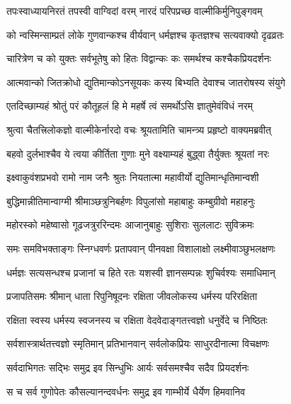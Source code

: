 
\twolineshloka
{तपःस्वाध्यायनिरतं तपस्वी वाग्विदां वरम्}
{नारदं परिपप्रच्छ वाल्मीकिर्मुनिपुङ्गवम्} %

\twolineshloka
{को न्वस्मिन्साम्प्रतं लोके गुणवान्कश्च वीर्यवान्}
{धर्मज्ञश्च कृतज्ञश्च सत्यवाक्यो दृढव्रतः} %

\twolineshloka
{चारित्रेण च को युक्तः सर्वभूतेषु को हितः}
{विद्वान्कः कः समर्थश्च कश्चैकप्रियदर्शनः} %

\twolineshloka
{आत्मवान्को जितक्रोधो द्युतिमान्कोऽनसूयकः}
{कस्य बिभ्यति देवाश्च जातरोषस्य संयुगे} %

\twolineshloka
{एतदिच्छाम्यहं श्रोतुं परं कौतूहलं हि मे}
{महर्षे त्वं समर्थोऽसि ज्ञातुमेवंविधं नरम्} %

\twolineshloka
{श्रुत्वा चैतत्त्रिलोकज्ञो वाल्मीकेर्नारदो वचः}
{श्रूयतामिति चामन्त्र्य प्रहृष्टो वाक्यमब्रवीत्} %

\twolineshloka
{बहवो दुर्लभाश्चैव ये त्वया कीर्तिता गुणाः}
{मुने वक्ष्याम्यहं बुद्ध्वा तैर्युक्तः श्रूयतां नरः} %

\twolineshloka
{इक्ष्वाकुवंशप्रभवो रामो नाम जनैः श्रुतः}
{नियतात्मा महावीर्यो द्युतिमान्धृतिमान्वशी} %

\twolineshloka
{बुद्धिमान्नीतिमान्वाग्मी श्रीमाञ्छत्रुनिबर्हणः}
{विपुलांसो महाबाहुः कम्बुग्रीवो महाहनुः} %

\twolineshloka
{महोरस्को महेष्वासो गूढजत्रुररिन्दमः}
{आजानुबाहुः सुशिराः सुललाटः सुविक्रमः} %

\twolineshloka
{समः समविभक्ताङ्गः स्निग्धवर्णः प्रतापवान्}
{पीनवक्षा विशालाक्षो लक्ष्मीवाञ्छुभलक्षणः} %

\twolineshloka
{धर्मज्ञः सत्यसन्धश्च प्रजानां च हिते रतः}
{यशस्वी ज्ञानसम्पन्नः शुचिर्वश्यः समाधिमान्} %

\twolineshloka
{प्रजापतिसमः श्रीमान् धाता रिपुनिषूदनः}
{रक्षिता जीवलोकस्य धर्मस्य परिरक्षिता} %

\twolineshloka
{रक्षिता स्वस्य धर्मस्य स्वजनस्य च रक्षिता}
{वेदवेदाङ्गतत्त्वज्ञो धनुर्वेदे च निष्ठितः} %

\twolineshloka
{सर्वशास्त्रार्थतत्त्वज्ञो स्मृतिमान् प्रतिभानवान्}
{सर्वलोकप्रियः साधुरदीनात्मा विचक्षणः} %

\twolineshloka
{सर्वदाभिगतः सद्भिः समुद्र इव सिन्धुभिः}
{आर्यः सर्वसमश्चैव सदैव प्रियदर्शनः} %

\twolineshloka
{स च सर्व गुणोपेतः कौसल्यानन्दवर्धनः}
{समुद्र इव गाम्भीर्ये धैर्येण हिमवानिव} %

